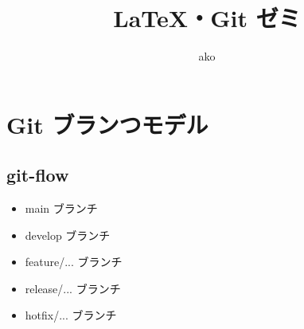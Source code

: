\documentclass[uplatex, dvipdfmx, a4paper, 12pt]{jsarticle}
\title{\LaTeX ・Git ゼミ }
\author{ako}
\begin{document}
\maketitle

\section{Git ブランつモデル}
\subsection{git-flow}
  
\begin{itemize}
  \item main ブランチ
  \item develop ブランチ
  \item feature/... ブランチ
  \item release/... ブランチ
  \item hotfix/... ブランチ
\end{itemize}
\end{document}

